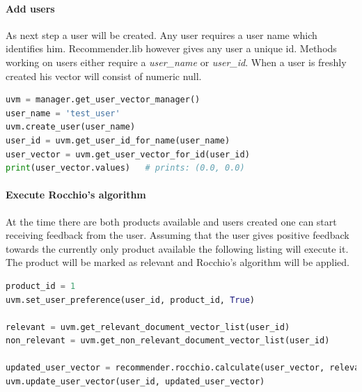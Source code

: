 \paragraph{Add users}
As next step a user will be created.
Any user requires a user name which identifies him.
Recommender.lib however gives any user a unique id.
Methods working on users either require a \textit{user\_name} or \textit{user\_id}.
When a user is freshly created his vector will consist of numeric null.
\begin{lstlisting}[language=Python,caption={Add user},label={lst:recommenderlib-user-add}]
uvm = manager.get_user_vector_manager()
user_name = 'test_user'
uvm.create_user(user_name)
user_id = uvm.get_user_id_for_name(user_name)
user_vector = uvm.get_user_vector_for_id(user_id)
print(user_vector.values)   # prints: (0.0, 0.0)
\end{lstlisting}

\paragraph{Execute Rocchio's algorithm}
At the time there are both products available and users created one can start receiving feedback from the user.
Assuming that the user gives positive feedback towards the currently only product available the following listing will execute it.
The product will be marked as relevant and Rocchio's algorithm will be applied.
\begin{lstlisting}[language=Python,caption={Execute Rocchio's algorithm},label={lst:recommenderlib-rocchio}]
product_id = 1
uvm.set_user_preference(user_id, product_id, True)

relevant = uvm.get_relevant_document_vector_list(user_id)
non_relevant = uvm.get_non_relevant_document_vector_list(user_id)

updated_user_vector = recommender.rocchio.calculate(user_vector, relevant, non_relevant)
uvm.update_user_vector(user_id, updated_user_vector)
\end{lstlisting}

